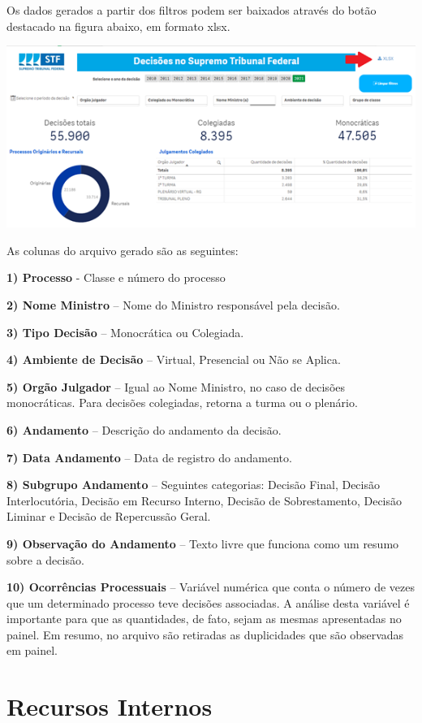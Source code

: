 \documentclass[
]{book}
\begin{document}
Os dados gerados a partir dos filtros podem ser baixados através do botão destacado na figura abaixo, em formato xlsx.

\begin{center}\includegraphics[width=0.8\linewidth,height=0.95\textheight]{imagens/imagem_3_decisoes} \end{center}

As colunas do arquivo gerado são as seguintes:

\textbf{1) Processo} - Classe e número do processo

\textbf{2) Nome Ministro} -- Nome do Ministro responsável pela decisão.

\textbf{3) Tipo Decisão} -- Monocrática ou Colegiada.

\textbf{4) Ambiente de Decisão} -- Virtual, Presencial ou Não se Aplica.

\textbf{5) Orgão Julgador} -- Igual ao Nome Ministro, no caso de decisões monocráticas. Para decisões colegiadas, retorna a turma ou o plenário.

\textbf{6) Andamento} -- Descrição do andamento da decisão.

\textbf{7) Data Andamento} -- Data de registro do andamento.

\textbf{8) Subgrupo Andamento} -- Seguintes categorias: Decisão Final, Decisão Interlocutória, Decisão em Recurso Interno, Decisão de Sobrestamento, Decisão Liminar e Decisão de Repercussão Geral.

\textbf{9) Observação do Andamento} -- Texto livre que funciona como um resumo sobre a decisão.

\textbf{10) Ocorrências Processuais} -- Variável numérica que conta o número de vezes que um determinado processo teve decisões associadas. A análise desta variável é importante para que as quantidades, de fato, sejam as mesmas apresentadas no painel. Em resumo, no arquivo são retiradas as duplicidades que são observadas em painel.

\hypertarget{recursos-internos-1}{%
\chapter{Recursos Internos}\label{recursos-internos-1}}
\end{document}
